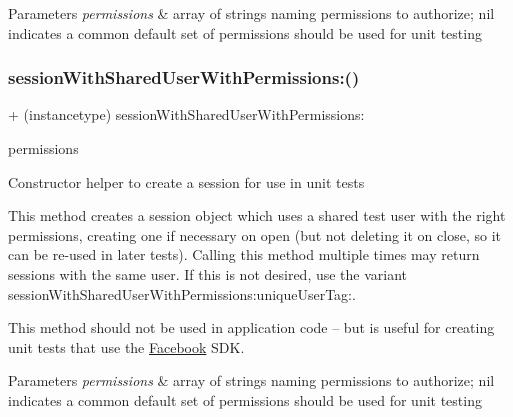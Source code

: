 \begin{DoxyParams}{Parameters}
{\em permissions} & array of strings naming permissions to authorize; nil indicates a common default set of permissions should be used for unit testing \\
\hline
\end{DoxyParams}
\mbox{\label{interfaceFBTestSession_a27f8f36ddb23ea218117bc2e927d8039}} 
\subsubsection{\texorpdfstring{session\+With\+Shared\+User\+With\+Permissions\+:()}{sessionWithSharedUserWithPermissions:()}\hspace{0.1cm}{\footnotesize\ttfamily [2/5]}}
{\footnotesize\ttfamily + (instancetype) session\+With\+Shared\+User\+With\+Permissions\+: \begin{DoxyParamCaption}\item[{(N\+S\+Array $\ast$)}]{permissions }\end{DoxyParamCaption}}

Constructor helper to create a session for use in unit tests

This method creates a session object which uses a shared test user with the right permissions, creating one if necessary on open (but not deleting it on close, so it can be re-\/used in later tests). Calling this method multiple times may return sessions with the same user. If this is not desired, use the variant session\+With\+Shared\+User\+With\+Permissions\+:unique\+User\+Tag\+:.

This method should not be used in application code -- but is useful for creating unit tests that use the \hyperlink{interfaceFacebook}{Facebook} S\+DK.


\begin{DoxyParams}{Parameters}
{\em permissions} & array of strings naming permissions to authorize; nil indicates a common default set of permissions should be used for unit testing \\
\hline
\end{DoxyParams}
\mbox{\label{interfaceFBTestSession_a27f8f36ddb23ea218117bc2e927d8039}} 
